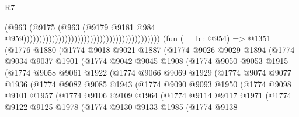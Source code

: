 \begin{lexlean}{R7}
\begin{coremodule}
                                                                                  (@963
                                                                                    (@9175
                                                                                      (@963
                                                                                        (@9179
                                                                                          @9181
                                                                                          @984
                                                                                          @959)))))))))))))))))))))))))))))))))))))))))))
    (fun (__b : @954) =>
    @1351
      (@1776
        @1880
        (@1774
          @9018
          @9021
          @1887
          (@1774
            @9026
            @9029
            @1894
            (@1774
              @9034
              @9037
              @1901
              (@1774
                @9042
                @9045
                @1908
                (@1774
                  @9050
                  @9053
                  @1915
                  (@1774
                    @9058
                    @9061
                    @1922
                    (@1774
                      @9066
                      @9069
                      @1929
                      (@1774
                        @9074
                        @9077
                        @1936
                        (@1774
                          @9082
                          @9085
                          @1943
                          (@1774
                            @9090
                            @9093
                            @1950
                            (@1774
                              @9098
                              @9101
                              @1957
                              (@1774
                                @9106
                                @9109
                                @1964
                                (@1774
                                  @9114
                                  @9117
                                  @1971
                                  (@1774
                                    @9122
                                    @9125
                                    @1978
                                    (@1774
                                      @9130
                                      @9133
                                      @1985
                                      (@1774
                                        @9138

\end{coremodule}
\end{lexlean}
